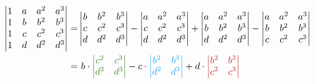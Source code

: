 \documentclass[main.tex]{subfiles}
\begin{document}
\begin{align*}
    \begin{vmatrix}
        1 & a & a^2 & a^3 \\
        1 & b & b^2 & b^3 \\
        1 & c & c^2 & c^3 \\
        1 & d & d^2 & d^3 \\
    \end{vmatrix} 
    =&
    \begin{vmatrix}
        b & b^2 & b^3 \\
        c & c^2 & c^3 \\
        d & d^2 & d^3 \\
    \end{vmatrix}
    -
    \begin{vmatrix}
        a & a^2 & a^3 \\
        c & c^2 & c^3 \\
        d & d^2 & d^3 \\
    \end{vmatrix}
    +
    \begin{vmatrix}
        a & a^2 & a^3 \\
        b & b^2 & b^3 \\
        d & d^2 & d^3 \\
    \end{vmatrix}
    -
    \begin{vmatrix}
        a & a^2 & a^3 \\
        b & b^2 & b^3 \\
        c & c^2 & c^3 \\
    \end{vmatrix}\\
    =&\ 
    b \cdot \textcolor{OliveGreen}{\begin{vmatrix}
        c^2 & c^3 \\
        d^2 & d^3 \\
    \end{vmatrix}}
    - c \cdot
    \textcolor{Cerulean}{\begin{vmatrix}
        b^2 & b^3 \\
        d^2 & d^3 \\
    \end{vmatrix}}
    + d \cdot
    \textcolor{BrickRed}{\begin{vmatrix}
        b^2 & b^3 \\
        c^2 & c^3 \\
    \end{vmatrix}}\\

\end{align*}
\end{document}
